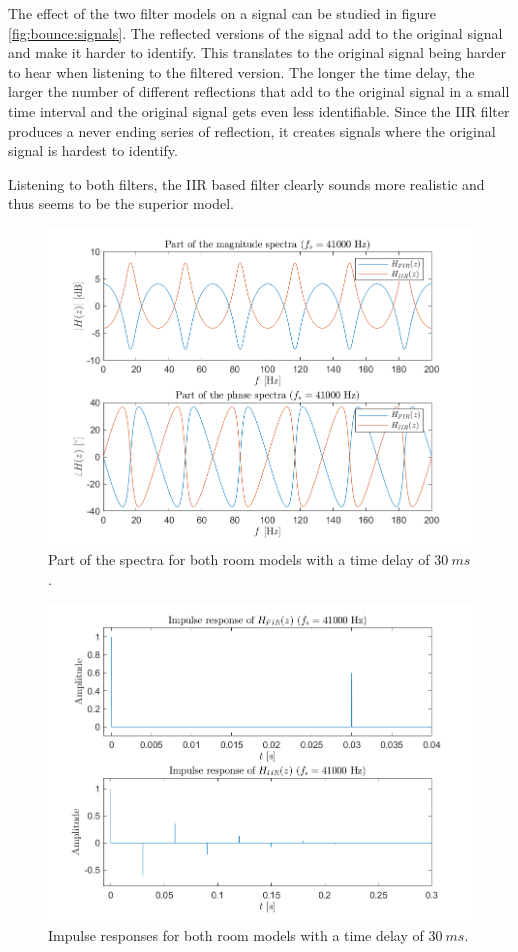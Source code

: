 \documentclass[journal]{IEEEtran}
\begin{document}
The effect of the two filter models on a signal can be studied in figure \ref{fig:bounce:signals}. The reflected versions of the signal add to the original signal and make it harder to identify. This translates to the original signal being harder to hear when listening to the filtered version. The longer the time delay, the larger the number of different reflections that add to the original signal in a small time interval and the original signal gets even less identifiable. Since the IIR filter produces a never ending series of reflection, it creates signals where the original signal is hardest to identify.

Listening to both filters, the IIR based filter clearly sounds more realistic and thus seems to be the superior model.

\begin{figure}
    \centering
    \includegraphics[width=\linewidth]{assignment_01/plots/bounce_spectra.png}
    \caption{Part of the spectra for both room models with a time delay of $\SI{30}{ms}$.}
    \label{fig:bounce:spectra}
\end{figure}
\begin{figure}
    \centering
    \includegraphics[width=\linewidth]{assignment_01/plots/bonuce_impulse.png}
    \caption{Impulse responses for both room models with a time delay of $\SI{30}{ms}$.}
    \label{fig:bounce:impulse}
\end{figure}
\end{document}
